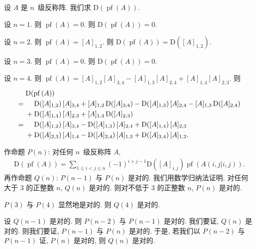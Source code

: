 \documentclass[../libro.tex]{subfiles}
\begin{document}
\begin{example}
    设 \(A\) 是 \(n\)~级反称阵.
    我们求 \(\mathrm{D} (\operatorname{pf} {(A)})\).

    设 \(n = 1\).
    则 \(\operatorname{pf} {(A)} = 0\).
    则 \(\mathrm{D} (\operatorname{pf} {(A)}) = 0\).

    设 \(n = 2\).
    则 \(\operatorname{pf} {(A)} = [A]_{1,2}\).
    则 \(\mathrm{D} (\operatorname{pf} {(A)})
    = \mathrm{D} ([A]_{1,2})\).

    设 \(n = 3\).
    则 \(\operatorname{pf} {(A)} = 0\).
    则 \(\mathrm{D} (\operatorname{pf} {(A)}) = 0\).

    设 \(n = 4\).
    则 \(\operatorname{pf} {(A)}
    = [A]_{1,2} [A]_{3,4} - [A]_{1,3} [A]_{2,4} + [A]_{1,4} [A]_{2,3}\).
    则
    \begin{align*}
        &
        \mathrm{D} (\operatorname{pf} {(A)})
        \\
        = {} &
        \hphantom{{} + {}}
        \mathrm{D} ([A]_{1,2})\, [A]_{3,4}
        + [A]_{1,2}\, \mathrm{D} ([A]_{3,4})
        - \mathrm{D} ([A]_{1,3})\, [A]_{2,4}
        - [A]_{1,3}\, \mathrm{D} ([A]_{2,4})
        \\
        &
        + \mathrm{D} ([A]_{1,4})\, [A]_{2,3}
        + [A]_{1,4}\, \mathrm{D} ([A]_{2,3})
        \\
        = {} &
        \hphantom{{} + {}}
        \mathrm{D} ([A]_{1,2})\, [A]_{3,4}
        - \mathrm{D} ([A]_{1,3})\, [A]_{2,4}
        + \mathrm{D} ([A]_{1,4})\, [A]_{2,3}
        \\
        &
        + \mathrm{D} ([A]_{2,3})\, [A]_{1,4}
        - \mathrm{D} ([A]_{2,4})\, [A]_{1,3}
        + \mathrm{D} ([A]_{3,4})\, [A]_{1,2}.
    \end{align*}

    作命题 \(P(n)\):
    对任何 \(n\)~级反称阵 \(A\),
    \begin{align*}
        \mathrm{D} (\operatorname{pf} {(A)})
        = \sum_{1 \leq i < j \leq n}
        {(-1)^{i+j-1} \mathrm{D} ([A]_{i,j})
        \operatorname{pf} {(A({i,j}|{i,j}))}}.
    \end{align*}
    再作命题 \(Q(n)\):
    \(P(n-1)\) 与 \(P(n)\) 是对的.
    我们用数学归纳法证明,
    对任何大于 \(3\) 的正整数 \(n\), \(Q(n)\) 是对的.
    则对不低于 \(3\) 的正整数 \(n\), \(P(n)\) 是对的.

    \(P(3)\) 与 \(P(4)\) 显然地是对的.
    则 \(Q(4)\) 是对的.

    设 \(Q(n-1)\) 是对的.
    则 \(P(n-2)\) 与 \(P(n-1)\) 是对的.
    我们要证, \(Q(n)\) 是对的.
    则我们要证, \(P(n-1)\) 与 \(P(n)\) 是对的.
    于是, 若我们以 \(P(n-2)\) 与 \(P(n-1)\) 证,
    \(P(n)\) 是对的,
    则 \(Q(n)\) 是对的.


\end{example}
\end{document}

